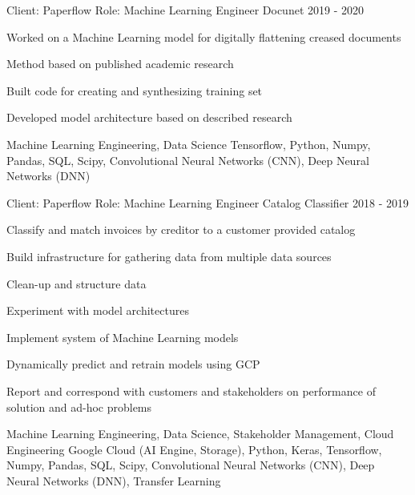 \begin{cventries}
\cventry
{Client: Paperflow \newline Role: Machine Learning Engineer} %
{Docunet} %
{}%
{2019 - 2020} %
{ %
\begin{cvitems}
    \item {Worked on a Machine Learning model for digitally flattening creased documents}
    \item {Method based on published academic research}
    \item {Built code for creating and synthesizing training set}
    \item {Developed model architecture based on described research}
\end{cvitems}
\cventrykeywords
{Machine Learning Engineering, Data Science}
{Tensorflow, Python, Numpy, Pandas, SQL, Scipy, Convolutional Neural Networks (CNN), Deep Neural Networks (DNN)}
}

\cventry
{Client: Paperflow \newline Role: Machine Learning Engineer} %
{Catalog Classifier} %
{}%
{2018 - 2019} %
{ %
\begin{cvitems}
    \item {Classify and match invoices by creditor to a customer provided catalog}
    \item {Build infrastructure for gathering data from multiple data sources}
    \item {Clean-up and structure data}
    \item {Experiment with model architectures}
    \item {Implement system of Machine Learning models}
    \item {Dynamically predict and retrain models using GCP}
    \item {Report and correspond with customers and stakeholders on performance of solution and ad-hoc problems}
\end{cvitems}
\cventrykeywords
{Machine Learning Engineering, Data Science, Stakeholder Management, Cloud Engineering}
{Google Cloud (AI Engine, Storage), Python, Keras, Tensorflow, Numpy, Pandas, SQL, Scipy, Convolutional Neural Networks (CNN), Deep Neural Networks (DNN), Transfer Learning}
}


\end{cventries}
